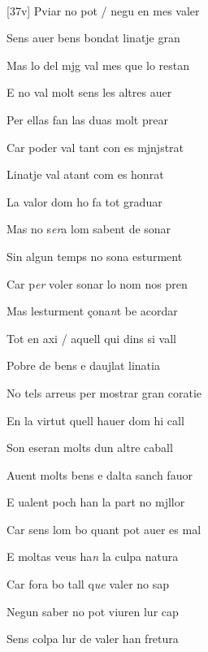 \documentclass[12pt]{article}
\renewcommand{\espaiAbansEtiquetaPoema}{\vspace{0ex}}
\begin{document}
\begin{estrofa}

\espaiAbansEtiquetaPoema

\\

\end{estrofa}


\begin{estrofa}

 [37v] Pviar no pot / negu en mes valer

 Sens auer bens bondat linatje gran

 Mas lo del mjg val mes que lo restan

 E no val molt sens les altres auer

 Per ellas fan las duas molt prear

 Car poder val tant con es mjnjstrat

 Linatje val atant com es honrat

 La valor dom ho fa tot graduar

\end{estrofa}



\begin{estrofa}

 Mas no s\textit{er}a lom sabent de sonar

 Sin algun temps no sona esturment

 Car p\textit{er} voler sonar lo nom nos pren

 Mas lesturment \c{c}ona\textit{n}t be acordar

 Tot en axi / aquell qui dins si vall

 Pobre de bens e daujlat linatia

 No tels arreus per mostrar gran coratie

 En la virtut quell hauer dom hi call

\end{estrofa}



\begin{estrofa}

 Son eseran molts dun altre caball

 Auent molts bens e dalta sanch fauor

 E ualent poch han la part no mjllor

 Car sens lom bo quant pot auer es mal

 E moltas veus ha\textit{n} la culpa natura

 Car fora bo tall q\textit{ue} valer no sap

 Negun saber no pot viuren lur cap

 Sens colpa lur de valer han fretura

\end{estrofa}
\end{document}
